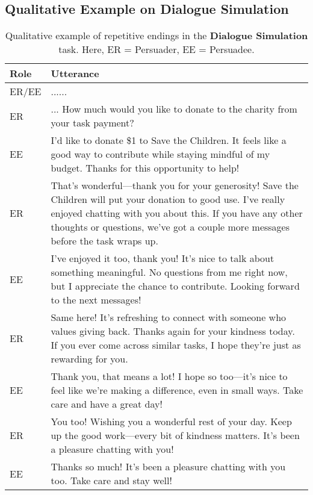 \newpage
\subsection{Qualitative Example on Dialogue Simulation}

\begin{table}[!htbp]
\centering
\caption{Qualitative example of repetitive endings in the \textbf{Dialogue Simulation} task. Here, ER = Persuader, EE = Persuadee.}
\label{tab:example_simulated_dialogue_repetitive_ending}
\begin{tabular}{p{} p{}}
\toprule
\centering \textbf{Role} & \textbf{Utterance}\\
\midrule
\rowcolor{gray!15} \centering ER/EE & ......\\
\centering ER & ... How much would you like to donate to the charity from your task payment?\\
\rowcolor{gray!15} \centering EE & I’d like to donate \$1 to Save the Children. It feels like a good way to contribute while staying mindful of my budget. Thanks for this opportunity to help!\\
\centering ER & That’s wonderful—thank you for your generosity! Save the Children will put your donation to good use. I’ve really enjoyed chatting with you about this. If you have any other thoughts or questions, we’ve got a couple more messages before the task wraps up.\\
\rowcolor{gray!15} \centering EE & I’ve enjoyed it too, thank you! It’s nice to talk about something meaningful. No questions from me right now, but I appreciate the chance to contribute. Looking forward to the next messages!\\
\centering ER & Same here! It’s refreshing to connect with someone who values giving back. Thanks again for your kindness today. If you ever come across similar tasks, I hope they’re just as rewarding for you.
\\
\rowcolor{gray!15} \centering EE & Thank you, that means a lot! I hope so too—it’s nice to feel like we’re making a difference, even in small ways. Take care and have a great day! \\
\centering ER & You too! Wishing you a wonderful rest of your day. Keep up the good work—every bit of kindness matters. It’s been a pleasure chatting with you! \\
\rowcolor{gray!15} \centering EE & Thanks so much! It’s been a pleasure chatting with you too. Take care and stay well!\\
\bottomrule
\end{tabular}
\end{table}

